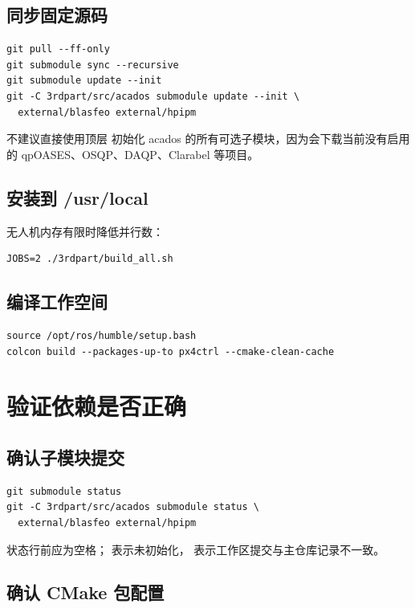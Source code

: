 \documentclass[UTF8,a4paper,11pt]{ctexart}
\newcommand{\code}[1]{\texttt{\detokenize{#1}}}
\begin{document}
\subsection{同步固定源码}

\begin{lstlisting}
git pull --ff-only
git submodule sync --recursive
git submodule update --init
git -C 3rdpart/src/acados submodule update --init \
  external/blasfeo external/hpipm
\end{lstlisting}

不建议直接使用顶层 \code{--recursive} 初始化 acados 的所有可选子模块，因为会下载当前没有启用的 qpOASES、OSQP、DAQP、Clarabel 等项目。

\subsection{安装到 /usr/local}

无人机内存有限时降低并行数：
\begin{lstlisting}
JOBS=2 ./3rdpart/build_all.sh
\end{lstlisting}

\subsection{编译工作空间}

\begin{lstlisting}
source /opt/ros/humble/setup.bash
colcon build --packages-up-to px4ctrl --cmake-clean-cache
\end{lstlisting}

\section{验证依赖是否正确}

\subsection{确认子模块提交}

\begin{lstlisting}
git submodule status
git -C 3rdpart/src/acados submodule status \
  external/blasfeo external/hpipm
\end{lstlisting}

状态行前应为空格；\code{-} 表示未初始化，\code{+} 表示工作区提交与主仓库记录不一致。

\subsection{确认 CMake 包配置}
\end{document}
